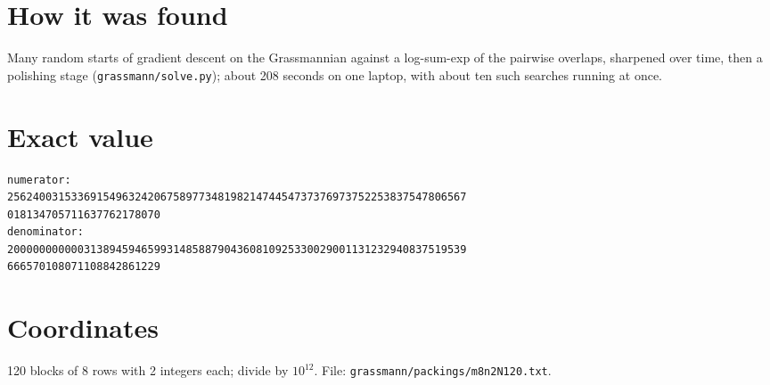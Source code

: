 \documentclass[11pt,a4paper]{article}
\begin{document}
\section{How it was found}
Many random starts of gradient descent on the Grassmannian against a log-sum-exp of the pairwise overlaps, sharpened over time, then a polishing stage (\texttt{grassmann/solve.py}); about 208 seconds on one laptop, with about ten such searches running at once.


\appendix
\section{Exact value}
{\small
\begin{verbatim}
numerator:
256240031533691549632420675897734819821474454737376973752253837547806567
018134705711637762178070
denominator:
200000000000313894594659931485887904360810925330029001131232940837519539
666570108071108842861229
\end{verbatim}}

\section{Coordinates}
120 blocks of 8 rows with 2 integers each; divide by $10^{12}$. File: \texttt{grassmann/packings/m8n2N120.txt}.
{\tiny
\begin{multicols}{4}
\end{multicols}}
\end{document}
